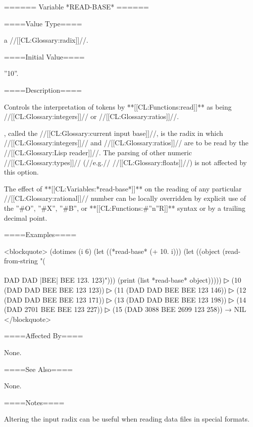 ====== Variable *READ-BASE* ======

====Value Type====

a //[[CL:Glossary:radix]]//.

====Initial Value====

''10''.

====Description====

Controls the interpretation of tokens by **[[CL:Functions:read]]** as being //[[CL:Glossary:integers]]// or //[[CL:Glossary:ratios]]//.

, called the //[[CL:Glossary:current input base]]//, is the radix in which //[[CL:Glossary:integers]]// and //[[CL:Glossary:ratios]]// are to be read by the //[[CL:Glossary:Lisp reader]]//. The parsing of other numeric //[[CL:Glossary:types]]// (//e.g.// //[[CL:Glossary:floats]]//) is not affected by this option.

The effect of **[[CL:Variables:*read-base*]]** on the reading of any particular //[[CL:Glossary:rational]]// number can be locally overridden by explicit use of the ''#O'', ''#X'', ''#B'', or **[[CL:Functions:#''n''R]]** syntax or by a trailing decimal point.

====Examples====

<blockquote> (dotimes (i 6) (let ((*read-base* (+ 10. i))) (let ((object (read-from-string "(\\\\DAD DAD |BEE| BEE 123. 123)"))) (print (list *read-base* object)))))
▷ (10 (DAD DAD BEE BEE 123 123))
▷ (11 (DAD DAD BEE BEE 123 146))
▷ (12 (DAD DAD BEE BEE 123 171))
▷ (13 (DAD DAD BEE BEE 123 198))
▷ (14 (DAD 2701 BEE BEE 123 227))
▷ (15 (DAD 3088 BEE 2699 123 258)) → NIL </blockquote>

====Affected By====

None.

====See Also====

None.

====Notes====

Altering the input radix can be useful when reading data files in special formats.

